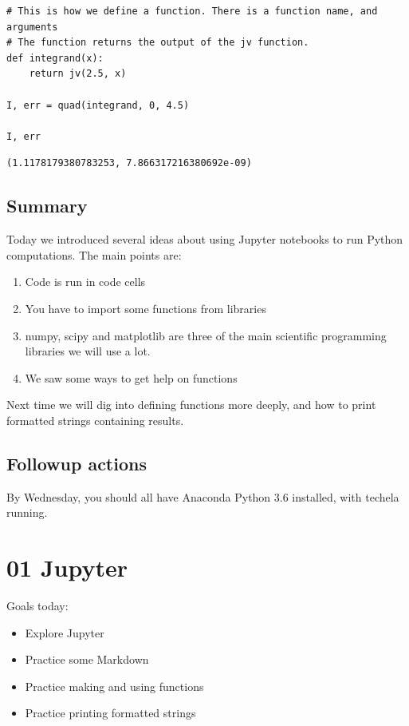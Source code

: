 \documentclass[11pt]{article}
\begin{document}
\begin{verbatim}
# This is how we define a function. There is a function name, and arguments
# The function returns the output of the jv function.
def integrand(x):
    return jv(2.5, x)

I, err = quad(integrand, 0, 4.5)

I, err
\end{verbatim}

\begin{verbatim}
(1.1178179380783253, 7.866317216380692e-09)
\end{verbatim}

\subsection{Summary}
\label{sec:org7566d01}

Today we introduced several ideas about using Jupyter notebooks to run Python computations. The main points are:

\begin{enumerate}
\item Code is run in code cells
\item You have to import some functions from libraries
\item numpy, scipy and matplotlib are three of the main scientific programming libraries we will use a lot.
\item We saw some ways to get help on functions
\end{enumerate}

Next time we will dig into defining functions more deeply, and how to print formatted strings containing results.

\subsection{Followup actions}
\label{sec:org3878a1c}

By Wednesday, you should all have Anaconda Python 3.6 installed, with techela running.
\section{01 Jupyter}
\label{sec:org3b30249}

Goals today:
\begin{itemize}
\item Explore Jupyter
\item Practice some Markdown
\item Practice making and using functions
\item Practice printing formatted strings
\end{itemize}
\end{document}
